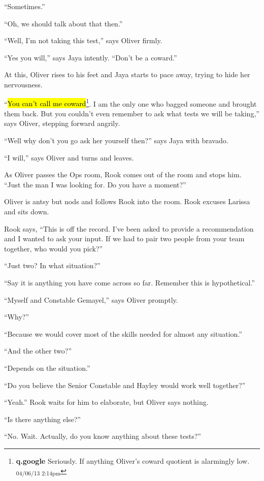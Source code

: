 ``Sometimes.''

``Oh, we should talk about that then.''

``Well, I'm not taking this test,'' says Oliver firmly.

``Yes you will,'' says Jaya intently. ``Don't be a coward.''

At this, Oliver rises to his feet and Jaya starts to pace away, trying to hide her nervousness.

``\hl{You can't call me coward}\footnote{\textbf{q.google }Seriously.  If anything Oliver's coward quotient is alarmingly low. \textsubscript{04/06/13 2:14pm}}.  I am the only one who bagged someone and brought them back.  But you couldn't even remember to ask what tests we will be taking,'' says Oliver, stepping forward angrily.

``Well why don't you go ask her yourself then?'' says Jaya with bravado.

``I will,'' says Oliver and turns and leaves.



As Oliver passes the Ops room, Rook comes out of the room and stops him.  ``Just the man I was looking for.  Do you have a moment?''

Oliver is antsy but nods and follows Rook into the room.  Rook excuses Larissa and sits down.

Rook says, ``This is off the record.  I've been asked to provide a recommendation and I wanted to ask your input.  If we had to pair two people from your team together, who would you pick?''

``Just two?  In what situation?''

``Say it is anything you have come across so far.  Remember this is hypothetical.''

``Myself and Constable Gemayel,'' says Oliver promptly.

``Why?''

``Because we would cover most of the skills needed for almost any situation.''

``And the other two?''

``Depends on the situation.''

``Do you believe the Senior Constable and Hayley would work well together?''

``Yeah.''  Rook waits for him to elaborate, but Oliver says nothing.

``Is there anything else?''

``No.  Wait.  Actually, do you know anything about these tests?''


